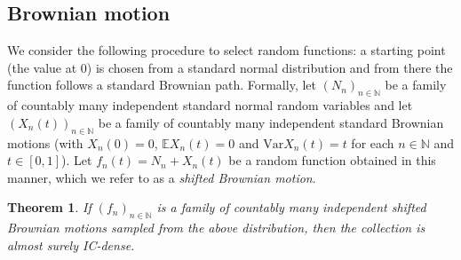 \documentclass{daj}
\newtheorem{thm}{Theorem}
\newcommand{\N}{\mathbb N}
\newcommand{\E}{\mathbb E}
\newcommand{\Var}{\mathrm{Var}}
\begin{document}
\subsection{Brownian motion}

We consider the following procedure to select random functions: a
starting point (the value at 0) is chosen from a standard normal
distribution and from there the function follows a standard Brownian
path. Formally, let $(N_n)_{n\in\N}$ be a family of countably many
independent standard normal random variables and let
$(X_n(t))_{n\in\N}$ be a family of countably many independent standard Brownian
motions (with $X_n(0)=0$, $\E X_n(t)=0$ and $\Var X_n(t)=t$ for
each $n\in\N$ and $t\in[0,1]$). Let $f_n(t)=N_n+X_n(t)$ be a random function
obtained in this manner, which we refer to as a {\sl shifted Brownian motion}.

\begin{thm}\label{thm:BM IC-dense}
If $(f_n)_{n\in\N}$ is a family of countably many independent shifted Brownian
motions sampled from the above distribution, then the collection is almost surely IC-dense.
\end{thm}
\end{document}
